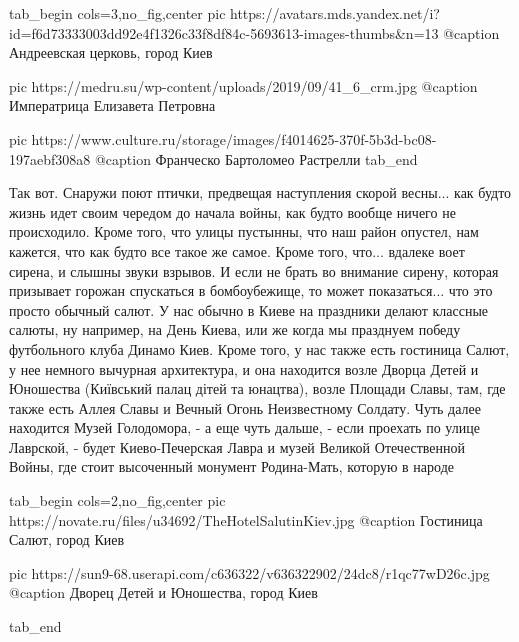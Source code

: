 \ifcmt
  tab_begin cols=3,no_fig,center
     pic https://avatars.mds.yandex.net/i?id=f6d73333003dd92e4f1326c33f8df84c-5693613-images-thumbs&n=13
		 @caption Андреевская церковь, город Киев

		 pic https://medru.su/wp-content/uploads/2019/09/41_6_crm.jpg
		 @caption Императрица Елизавета Петровна

		 pic https://www.culture.ru/storage/images/f4014625-370f-5b3d-bc08-197aebf308a8
		 @caption Франческо Бартоломео Растрелли
  tab_end
\fi

Так вот. Снаружи поют птички, предвещая наступления скорой весны... как будто
жизнь идет своим чередом до начала войны, как будто вообще ничего не
происходило. Кроме того, что улицы пустынны, что наш район опустел, нам
кажется, что как будто все такое же самое. Кроме того, что... вдалеке воет
сирена, и слышны звуки взрывов.  И если не брать во внимание сирену, которая
призывает горожан спускаться в бомбоубежище, то может показаться... что это
просто обычный салют. У нас обычно в Киеве на праздники делают классные салюты,
ну например, на День Киева, или же когда мы празднуем победу футбольного клуба
Динамо Киев. Кроме того, у нас также есть гостиница Салют, у нее немного
вычурная архитектура, и она находится возле Дворца Детей и Юношества (Київський
палац дітей та юнацтва), возле Площади Славы, там, где также есть Аллея Славы и
Вечный Огонь Неизвестному Солдату. Чуть далее находится Музей Голодомора, - а
еще чуть дальше, - если проехать по улице Лаврской, - будет Киево-Печерская
Лавра и музей Великой Отечественной Войны, где стоит высоченный монумент Родина-Мать, которую в народе

\ifcmt
  tab_begin cols=2,no_fig,center
		 pic https://novate.ru/files/u34692/TheHotelSalutinKiev.jpg
		 @caption Гостиница Салют, город Киев

		 pic https://sun9-68.userapi.com/c636322/v636322902/24dc8/r1qc77wD26c.jpg
		 @caption Дворец Детей и Юношества, город Киев

  tab_end
\fi

